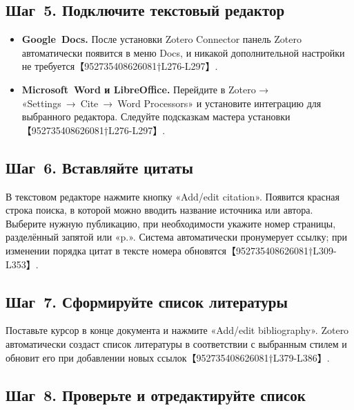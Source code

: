 \documentclass[
  russian,
  letterpaper,
]{book}
\providecommand{\tightlist}{%
  \setlength{\itemsep}{0pt}\setlength{\parskip}{0pt}}
\begin{document}
\subsection{Шаг~5. Подключите текстовый
редактор}\label{ux448ux430ux433-5.-ux43fux43eux434ux43aux43bux44eux447ux438ux442ux435-ux442ux435ux43aux441ux442ux43eux432ux44bux439-ux440ux435ux434ux430ux43aux442ux43eux440}

\begin{itemize}
\tightlist
\item
  \textbf{Google~Docs.} После установки Zotero Connector панель Zotero
  автоматически появится в меню Docs, и никакой дополнительной настройки
  не требуется【952735408626081†L276-L297】.
\item
  \textbf{Microsoft~Word и LibreOffice.} Перейдите в Zotero →
  «Settings~→~Cite~→~Word Processors» и установите интеграцию для
  выбранного редактора. Следуйте подсказкам мастера установки
  【952735408626081†L276-L297】.
\end{itemize}

\subsection{Шаг~6. Вставляйте
цитаты}\label{ux448ux430ux433-6.-ux432ux441ux442ux430ux432ux43bux44fux439ux442ux435-ux446ux438ux442ux430ux442ux44b}

В текстовом редакторе нажмите кнопку «Add/edit citation». Появится
красная строка поиска, в которой можно вводить название источника или
автора. Выберите нужную публикацию, при необходимости укажите номер
страницы, разделённый запятой или «p.». Система автоматически
пронумерует ссылку; при изменении порядка цитат в тексте номера
обновятся【952735408626081†L309-L353】.

\subsection{Шаг~7. Сформируйте список
литературы}\label{ux448ux430ux433-7.-ux441ux444ux43eux440ux43cux438ux440ux443ux439ux442ux435-ux441ux43fux438ux441ux43eux43a-ux43bux438ux442ux435ux440ux430ux442ux443ux440ux44b}

Поставьте курсор в конце документа и нажмите «Add/edit bibliography».
Zotero автоматически создаст список литературы в соответствии с
выбранным стилем и обновит его при добавлении новых
ссылок【952735408626081†L379-L386】.

\subsection{Шаг~8. Проверьте и отредактируйте
список}\label{ux448ux430ux433-8.-ux43fux440ux43eux432ux435ux440ux44cux442ux435-ux438-ux43eux442ux440ux435ux434ux430ux43aux442ux438ux440ux443ux439ux442ux435-ux441ux43fux438ux441ux43eux43a}
\end{document}
